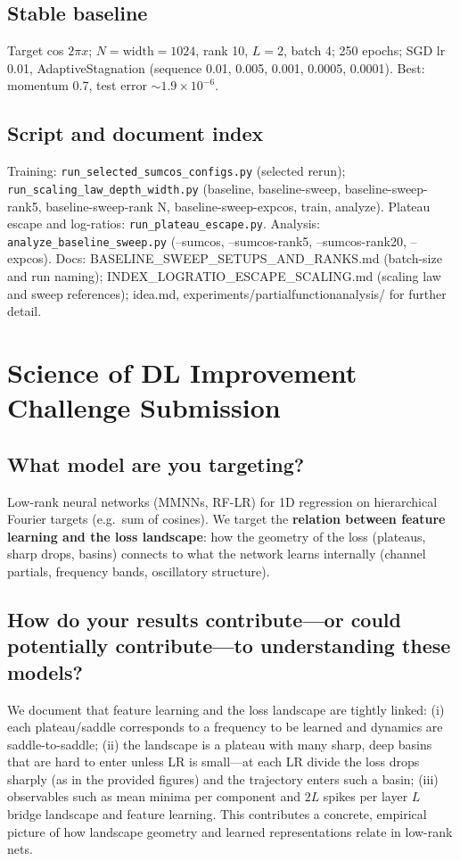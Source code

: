 \documentclass{article}
\begin{document}
\subsection{Stable baseline}
Target cos $2\pi x$; $N = \mathrm{width} = 1024$, rank 10, $L=2$, batch 4; 250 epochs; SGD lr 0.01, AdaptiveStagnation (sequence 0.01, 0.005, 0.001, 0.0005, 0.0001). Best: momentum 0.7, test error $\sim 1.9{\times}10^{-6}$.

\subsection{Script and document index}
Training: \texttt{run\_selected\_sumcos\_configs.py} (selected rerun); \texttt{run\_scaling\_law\_depth\_width.py} (baseline, baseline-sweep, baseline-sweep-rank5, baseline-sweep-rank N, baseline-sweep-expcos, train, analyze). Plateau escape and log-ratios: \texttt{run\_plateau\_escape.py}. Analysis: \texttt{analyze\_baseline\_sweep.py} (--sumcos, --sumcos-rank5, --sumcos-rank20, --expcos). Docs: BASELINE\_SWEEP\_SETUPS\_AND\_RANKS.md (batch-size and run naming); INDEX\_LOGRATIO\_ESCAPE\_SCALING.md (scaling law and sweep references); idea.md, experiments/partialfunctionanalysis/ for further detail.

\newpage
\section{Science of DL Improvement Challenge Submission}

\subsection{What model are you targeting?}
Low-rank neural networks (MMNNs, RF-LR) for 1D regression on hierarchical Fourier targets (e.g.\ sum of cosines). We target the \textbf{relation between feature learning and the loss landscape}: how the geometry of the loss (plateaus, sharp drops, basins) connects to what the network learns internally (channel partials, frequency bands, oscillatory structure).

\subsection{How do your results contribute—or could potentially contribute—to understanding these models?}
We document that feature learning and the loss landscape are tightly linked: (i) each plateau/saddle corresponds to a frequency to be learned and dynamics are saddle-to-saddle; (ii) the landscape is a plateau with many sharp, deep basins that are hard to enter unless LR is small---at each LR divide the loss drops sharply (as in the provided figures) and the trajectory enters such a basin; (iii) observables such as mean minima per component and $2L$ spikes per layer $L$ bridge landscape and feature learning. This contributes a concrete, empirical picture of how landscape geometry and learned representations relate in low-rank nets.
\end{document}
